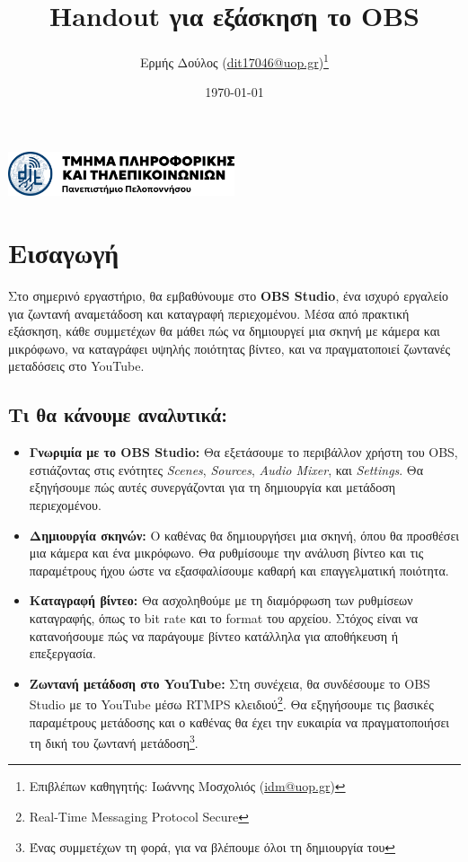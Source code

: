 \documentclass[12pt,a4paper]{article}
\title{\textbf{Handout για εξάσκηση το OBS}}
\author{Ερμής Δούλος (\href{mailto:dit17046@uop.gr}{dit17046@uop.gr})\thanks{Επιβλέπων καθηγητής: Ιωάννης Μοσχολιός (\href{mailto:idm@uop.gr}{idm@uop.gr})}}
\date{\today}
\begin{document}
\maketitle
\begin{center}
  \includegraphics[width=0.5\textwidth]{Figures/uop.png}
\end{center}
\tableofcontents
\noindent\makebox[\linewidth]{\rule{\textwidth}{1.5pt}}

\section*{Εισαγωγή}

Στο σημερινό εργαστήριο, θα εμβαθύνουμε στο \textbf{OBS Studio}, ένα ισχυρό εργαλείο
για ζωντανή αναμετάδοση και καταγραφή περιεχομένου. Μέσα από πρακτική εξάσκηση,
κάθε συμμετέχων θα μάθει πώς να δημιουργεί μια σκηνή με κάμερα και μικρόφωνο, να
καταγράφει υψηλής ποιότητας βίντεο, και να πραγματοποιεί ζωντανές μεταδόσεις στο
YouTube.

\subsection*{Τι θα κάνουμε αναλυτικά:}

\begin{itemize}
  \item \textbf{Γνωριμία με το OBS Studio:} Θα εξετάσουμε το περιβάλλον χρήστη του
        OBS, εστιάζοντας στις ενότητες \textit{Scenes}, \textit{Sources}, \textit{Audio
          Mixer}, και \textit{Settings}. Θα εξηγήσουμε πώς αυτές συνεργάζονται για τη
        δημιουργία και μετάδοση περιεχομένου.

  \item \textbf{Δημιουργία σκηνών:} Ο καθένας θα δημιουργήσει μια σκηνή, όπου θα
        προσθέσει μια κάμερα και ένα μικρόφωνο. Θα ρυθμίσουμε την ανάλυση βίντεο και τις
        παραμέτρους ήχου ώστε να εξασφαλίσουμε καθαρή και επαγγελματική ποιότητα.

  \item \textbf{Καταγραφή βίντεο:} Θα ασχοληθούμε με τη διαμόρφωση των ρυθμίσεων
        καταγραφής, όπως το bit rate και το format του αρχείου. Στόχος είναι να κατανοήσουμε
        πώς να παράγουμε βίντεο κατάλληλα για αποθήκευση ή επεξεργασία.

  \item \textbf{Ζωντανή μετάδοση στο YouTube:} Στη συνέχεια, θα συνδέσουμε το OBS
        Studio με το YouTube μέσω RTMPS κλειδιού\footnote{Real-Time Messaging Protocol Secure}. Θα εξηγήσουμε τις βασικές παραμέτρους
        μετάδοσης και ο καθένας θα έχει την ευκαιρία να πραγματοποιήσει τη δική του
        ζωντανή μετάδοση\footnote{Ένας συμμετέχων τη φορά, για να βλέπουμε όλοι τη δημιουργία του}.
\end{itemize}
\end{document}

